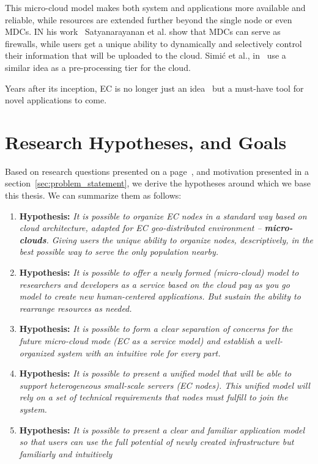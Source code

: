 This micro-cloud model makes both system and applications more available and reliable, while resources are extended further beyond the single node or even MDCs. IN his work~\cite{SatyanarayananK19} Satyanarayanan et al. show that MDCs can serve as firewalls, while users get a unique ability to dynamically and selectively control their information that will be uploaded to the cloud.  Simi\' c et al., in~\cite{inproceedingsSimic1} use a similar idea as a pre-processing tier for the cloud. 

Years after its inception, EC is no longer just an idea~\cite{SatyanarayananK19} but a must-have tool for novel applications to come. 
%
%
\section{Research Hypotheses, and Goals}\label{sec:research_hyphotesis_and_golas}
%
Based on research questions presented on a page~\pageref{questions}, and motivation presented in a section~\ref{sec:problem_statement}, we derive the hypotheses around which we base this thesis. We can summarize them as follows:

\begin{enumerate}[start=1,label={(\bfseries \arabic*)}]
	\item \textbf{Hypothesis:} \textit{It is possible to organize EC nodes in a standard way based on cloud architecture, adapted for EC geo-distributed environment -- \textbf{micro-clouds}. Giving users the unique ability to organize nodes, descriptively, in the best possible way to serve the only population nearby.}
	\item \textbf{Hypothesis:} \textit{It is possible to offer a newly formed (micro-cloud) model to researchers and developers as a service based on the cloud pay as you go model to create new human-centered applications. But sustain the ability to rearrange resources as needed.}
	\item \textbf{Hypothesis:} \textit{It is possible to form a clear separation of concerns for the future micro-cloud mode (EC as a service model) and establish a well-organized system with an intuitive role for every part.} 
	\item \textbf{Hypothesis:} \textit{It is possible to present a unified model that will be able to support heterogeneous small-scale servers (EC nodes). This unified model will rely on a set of technical requirements that nodes must fulfill to join the system.}
	\item \textbf{Hypothesis:} \textit{It is possible to present a clear and familiar application model so that users can use the full potential of newly created infrastructure but familiarly and intuitively}
\end{enumerate}

